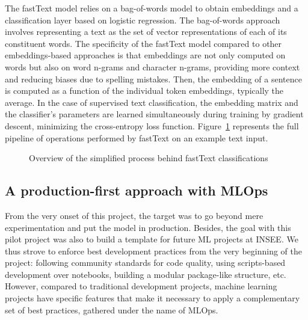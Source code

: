 \documentclass[graybox]{svmult}
\begin{document}
The fastText model relies on a bag-of-words model to obtain embeddings and a classification layer based on logistic regression. The bag-of-words approach involves representing a text as the set of vector representations of each of its constituent words. The specificity of the fastText model compared to other embeddings-based approaches is that embeddings are not only computed on words but also on word n-grams and character n-grams, providing more context and reducing biases due to spelling mistakes. Then, the embedding of a sentence is computed as a function of the individual token embeddings, typically the average. In the case of supervised text classification, the embedding matrix and the classifier's parameters are learned simultaneously during training by gradient descent, minimizing the cross-entropy loss function. Figure~\ref{fig:fasttext} represents the full pipeline of operations performed by fastText on an example text input.

\begin{figure}[htbp]
    \centering
    \caption{Overview of the simplified process behind fastText classifications}
    \label{fig:fasttext}
\end{figure}






\subsection{A production-first approach with MLOps}

From the very onset of this project, the target was to go beyond mere experimentation and put the model in production. Besides, the goal with this pilot project was also to build a template for future ML projects at INSEE. We thus strove to enforce best development practices from the very beginning of the project: following community standards for code quality, using scripts-based development over notebooks, building a modular package-like structure, etc. However, compared to traditional development projects, machine learning projects have specific features that make it necessary to apply a complementary set of best practices, gathered under the name of MLOps.
\end{document}
